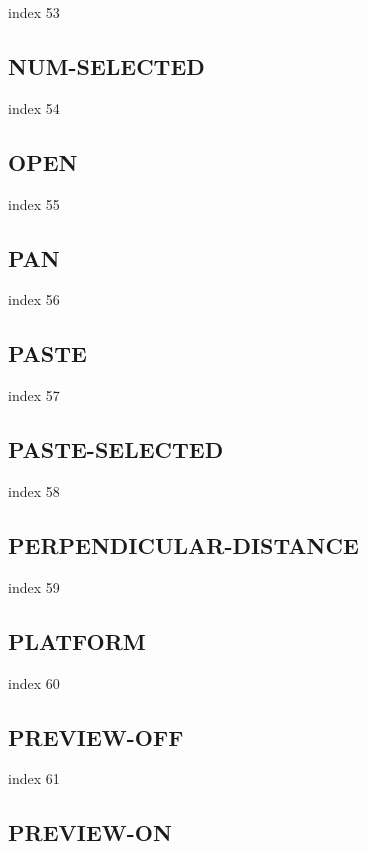 \documentclass[a4paper]{report}
\begin{document}
{{{{{{{{{{{{{index 53

\subsection{NUM-SELECTED}

index 54

\subsection{OPEN}

index 55

\subsection{PAN}

index 56

\subsection{PASTE}

index 57

\subsection{PASTE-SELECTED}

index 58

\subsection{PERPENDICULAR-DISTANCE}

index 59

\subsection{PLATFORM}

index 60

\subsection{PREVIEW-OFF}

index 61

\subsection{PREVIEW-ON}

}}}}}}}}}}}}}
\end{document}
